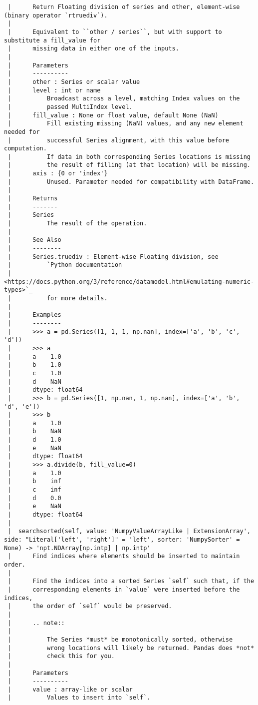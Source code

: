 \documentclass[
  letterpaper,
  DIV=11,
  numbers=noendperiod]{scrreprt}
\begin{document}
\begin{verbatim}
 |      Return Floating division of series and other, element-wise (binary operator `rtruediv`).
 |      
 |      Equivalent to ``other / series``, but with support to substitute a fill_value for
 |      missing data in either one of the inputs.
 |      
 |      Parameters
 |      ----------
 |      other : Series or scalar value
 |      level : int or name
 |          Broadcast across a level, matching Index values on the
 |          passed MultiIndex level.
 |      fill_value : None or float value, default None (NaN)
 |          Fill existing missing (NaN) values, and any new element needed for
 |          successful Series alignment, with this value before computation.
 |          If data in both corresponding Series locations is missing
 |          the result of filling (at that location) will be missing.
 |      axis : {0 or 'index'}
 |          Unused. Parameter needed for compatibility with DataFrame.
 |      
 |      Returns
 |      -------
 |      Series
 |          The result of the operation.
 |      
 |      See Also
 |      --------
 |      Series.truediv : Element-wise Floating division, see
 |          `Python documentation
 |          <https://docs.python.org/3/reference/datamodel.html#emulating-numeric-types>`_
 |          for more details.
 |      
 |      Examples
 |      --------
 |      >>> a = pd.Series([1, 1, 1, np.nan], index=['a', 'b', 'c', 'd'])
 |      >>> a
 |      a    1.0
 |      b    1.0
 |      c    1.0
 |      d    NaN
 |      dtype: float64
 |      >>> b = pd.Series([1, np.nan, 1, np.nan], index=['a', 'b', 'd', 'e'])
 |      >>> b
 |      a    1.0
 |      b    NaN
 |      d    1.0
 |      e    NaN
 |      dtype: float64
 |      >>> a.divide(b, fill_value=0)
 |      a    1.0
 |      b    inf
 |      c    inf
 |      d    0.0
 |      e    NaN
 |      dtype: float64
 |  
 |  searchsorted(self, value: 'NumpyValueArrayLike | ExtensionArray', side: "Literal['left', 'right']" = 'left', sorter: 'NumpySorter' = None) -> 'npt.NDArray[np.intp] | np.intp'
 |      Find indices where elements should be inserted to maintain order.
 |      
 |      Find the indices into a sorted Series `self` such that, if the
 |      corresponding elements in `value` were inserted before the indices,
 |      the order of `self` would be preserved.
 |      
 |      .. note::
 |      
 |          The Series *must* be monotonically sorted, otherwise
 |          wrong locations will likely be returned. Pandas does *not*
 |          check this for you.
 |      
 |      Parameters
 |      ----------
 |      value : array-like or scalar
 |          Values to insert into `self`.

\end{verbatim}
\end{document}
